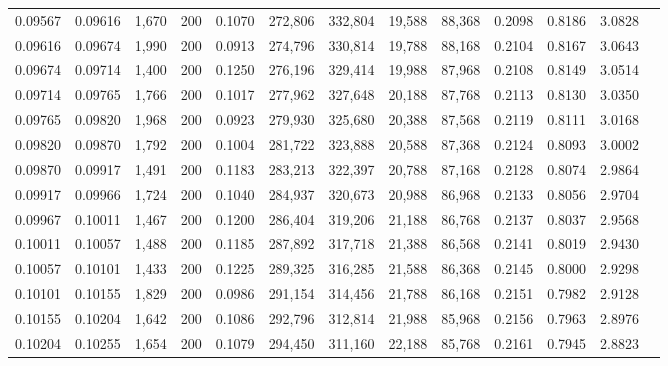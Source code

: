 \begin{tabular}{rrrrrrrrrrrrr}
0.09567 & 0.09616 & 1,670 & 200 &                                     0.1070 & 272,806 & 332,804 &  19,588 &  88,368 & 0.2098 & 0.8186 & 3.0828 \\
0.09616 & 0.09674 & 1,990 & 200 &                                     0.0913 & 274,796 & 330,814 &  19,788 &  88,168 & 0.2104 & 0.8167 & 3.0643 \\
0.09674 & 0.09714 & 1,400 & 200 &                                     0.1250 & 276,196 & 329,414 &  19,988 &  87,968 & 0.2108 & 0.8149 & 3.0514 \\
0.09714 & 0.09765 & 1,766 & 200 &                                     0.1017 & 277,962 & 327,648 &  20,188 &  87,768 & 0.2113 & 0.8130 & 3.0350 \\
0.09765 & 0.09820 & 1,968 & 200 &                                     0.0923 & 279,930 & 325,680 &  20,388 &  87,568 & 0.2119 & 0.8111 & 3.0168 \\
0.09820 & 0.09870 & 1,792 & 200 &                                     0.1004 & 281,722 & 323,888 &  20,588 &  87,368 & 0.2124 & 0.8093 & 3.0002 \\
0.09870 & 0.09917 & 1,491 & 200 &                                     0.1183 & 283,213 & 322,397 &  20,788 &  87,168 & 0.2128 & 0.8074 & 2.9864 \\
0.09917 & 0.09966 & 1,724 & 200 &                                     0.1040 & 284,937 & 320,673 &  20,988 &  86,968 & 0.2133 & 0.8056 & 2.9704 \\
0.09967 & 0.10011 & 1,467 & 200 &                                     0.1200 & 286,404 & 319,206 &  21,188 &  86,768 & 0.2137 & 0.8037 & 2.9568 \\
0.10011 & 0.10057 & 1,488 & 200 &                                     0.1185 & 287,892 & 317,718 &  21,388 &  86,568 & 0.2141 & 0.8019 & 2.9430 \\
0.10057 & 0.10101 & 1,433 & 200 &                                     0.1225 & 289,325 & 316,285 &  21,588 &  86,368 & 0.2145 & 0.8000 & 2.9298 \\
0.10101 & 0.10155 & 1,829 & 200 &                                     0.0986 & 291,154 & 314,456 &  21,788 &  86,168 & 0.2151 & 0.7982 & 2.9128 \\
0.10155 & 0.10204 & 1,642 & 200 &                                     0.1086 & 292,796 & 312,814 &  21,988 &  85,968 & 0.2156 & 0.7963 & 2.8976 \\
0.10204 & 0.10255 & 1,654 & 200 &                                     0.1079 & 294,450 & 311,160 &  22,188 &  85,768 & 0.2161 & 0.7945 & 2.8823 \\

\end{tabular}
